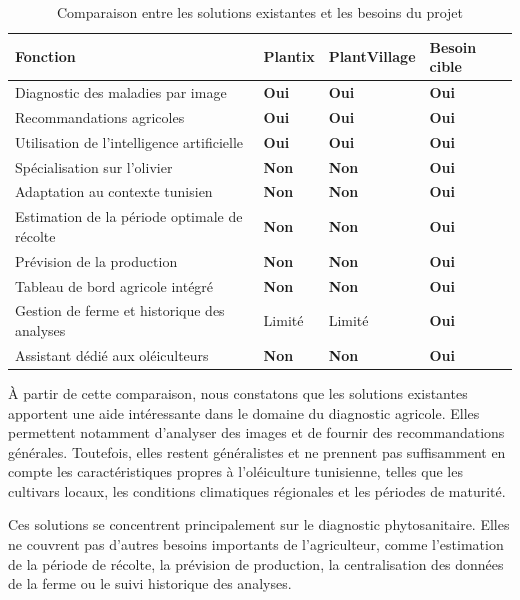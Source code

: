 \documentclass[12pt,a4paper]{report}
\newcommand{\yesmark}{\textcolor{green!50!black}{\textbf{Oui}}}
\newcommand{\nomark}{\textcolor{red!70!black}{\textbf{Non}}}
\begin{document}
\small
\setlength{\tabcolsep}{4pt}
\begin{table}[H]
\centering
\caption{Comparaison entre les solutions existantes et les besoins du projet}
\label{tab:comparaison-existant}
\begin{tabular}{|>{\raggedright\arraybackslash}p{5.2cm}|>{\centering\arraybackslash}p{1.8cm}|>{\centering\arraybackslash}p{2.7cm}|>{\raggedright\arraybackslash}p{3.2cm}|}
\hline
\textbf{Fonction} & \textbf{Plantix} & \textbf{PlantVillage} & \textbf{Besoin cible} \\
\hline
Diagnostic des maladies par image & \yesmark & \yesmark & \yesmark \\
\hline
Recommandations agricoles & \yesmark & \yesmark & \yesmark \\
\hline
Utilisation de l'intelligence artificielle & \yesmark & \yesmark & \yesmark \\
\hline
Spécialisation sur l'olivier & \nomark & \nomark & \yesmark \\
\hline
Adaptation au contexte tunisien & \nomark & \nomark & \yesmark \\
\hline
Estimation de la période optimale de récolte & \nomark & \nomark & \yesmark \\
\hline
Prévision de la production & \nomark & \nomark & \yesmark \\
\hline
Tableau de bord agricole intégré & \nomark & \nomark & \yesmark \\
\hline
Gestion de ferme et historique des analyses & Limité & Limité & \yesmark \\
\hline
Assistant dédié aux oléiculteurs & \nomark & \nomark & \yesmark \\
\hline
\end{tabular}
\end{table}
\normalsize

À partir de cette comparaison, nous constatons que les solutions existantes apportent une aide intéressante dans le domaine du diagnostic agricole. Elles permettent notamment d'analyser des images et de fournir des recommandations générales. Toutefois, elles restent généralistes et ne prennent pas suffisamment en compte les caractéristiques propres à l'oléiculture tunisienne, telles que les cultivars locaux, les conditions climatiques régionales et les périodes de maturité.

Ces solutions se concentrent principalement sur le diagnostic phytosanitaire. Elles ne couvrent pas d'autres besoins importants de l'agriculteur, comme l'estimation de la période de récolte, la prévision de production, la centralisation des données de la ferme ou le suivi historique des analyses.
\end{document}
